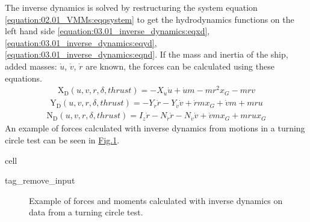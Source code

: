 \documentclass[review]{elsarticle}
\begin{document}
\sphinxAtStartPar
The inverse dynamics is solved by restructuring the system equation \autoref{equation:02.01_VMMs:eqqsystem} to get the hydrodynamics functions on the left hand side \autoref{equation:03.01_inverse_dynamics:eqxd}, \autoref{equation:03.01_inverse_dynamics:eqyd}, \autoref{equation:03.01_inverse_dynamics:eqnd}. If the mass and inertia of the ship, added masses: \(\dot{u}\), \(\dot{v}\), \(\dot{r}\) are known, the forces can be calculated using these equations.
\begin{equation}\label{equation:03.01_inverse_dynamics:eqxd}
\begin{split}\displaystyle \operatorname{X_{D}}{\left(u,v,r,\delta,thrust \right)} = - X_{\dot{u}} \dot{u} + \dot{u} m - m r^{2} x_{G} - m r v\end{split}
\end{equation}\begin{equation}\label{equation:03.01_inverse_dynamics:eqyd}
\begin{split}\displaystyle \operatorname{Y_{D}}{\left(u,v,r,\delta,thrust \right)} = - Y_{\dot{r}} \dot{r} - Y_{\dot{v}} \dot{v} + \dot{r} m x_{G} + \dot{v} m + m r u\end{split}
\end{equation}\begin{equation}\label{equation:03.01_inverse_dynamics:eqnd}
\begin{split}\displaystyle \operatorname{N_{D}}{\left(u,v,r,\delta,thrust \right)} = I_{z} \dot{r} - N_{\dot{r}} \dot{r} - N_{\dot{v}} \dot{v} + \dot{v} m x_{G} + m r u x_{G}\end{split}
\end{equation}
\sphinxAtStartPar
An example of forces calculated with inverse dynamics from motions in a turning circle test can be seen in \hyperref[\detokenize{03.01_inverse_dynamics:fig-inverse}]{Fig.\@ \ref{\detokenize{03.01_inverse_dynamics:fig-inverse}}}.

\begin{sphinxuseclass}{cell}
\begin{sphinxuseclass}{tag_remove_input}
\end{sphinxuseclass}
\end{sphinxuseclass}
\begin{figure}[H]
\centering
\capstart

\noindent{}
\caption{Example of forces and moments calculated with inverse dynamics on data from a turning circle test.}\label{\detokenize{03.01_inverse_dynamics:fig-inverse}}\end{figure}
\end{document}
